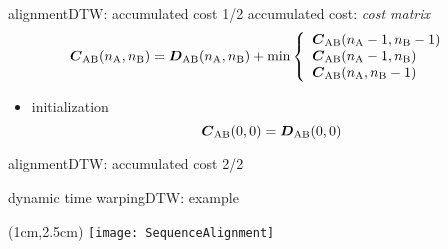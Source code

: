         \begin{frame}{alignment}{DTW: accumulated cost 1/2}
            accumulated cost: \textit{cost matrix}
                \begin{equation*}\label{eq:acccost}
                            \mat{C}_{\mathrm{AB}}(n_\mathrm{A},n_\mathrm{B}) = \mat{D}_{\mathrm{AB}}(n_\mathrm{A},n_\mathrm{B}) + \min\left\{
                                                    \begin{array}{llr} 
                                                        \mat{C}_{\mathrm{AB}}(n_\mathrm{A}-1, n_\mathrm{B}-1)\\
                                                        \mat{C}_{\mathrm{AB}}(n_\mathrm{A}-1, n_\mathrm{B}) \\
                                                        \mat{C}_{\mathrm{AB}}(n_\mathrm{A},	n_\mathrm{B}-1)
                                                    \end{array} 
                                                    \right. 
                \end{equation*}
                \begin{itemize}
                    \item	initialization
                        \begin{equation*}
                            \mat{C}_{\mathrm{AB}}(0,0) 	= \mat{D}_{\mathrm{AB}}(0,0) 
                        \end{equation*}
                \end{itemize}
                \begin{figure}
                    
                \end{figure}
        \end{frame}
        \begin{frame}{alignment}{DTW: accumulated cost 2/2}
            \vspace{-5mm}
        \end{frame}
        \begin{frame}{dynamic time warping}{DTW: example}
            \begin{textblock*}{100mm}(1cm,2.5cm)
                \texttt{[image: SequenceAlignment]}
            \end{textblock*}
        \end{frame}
